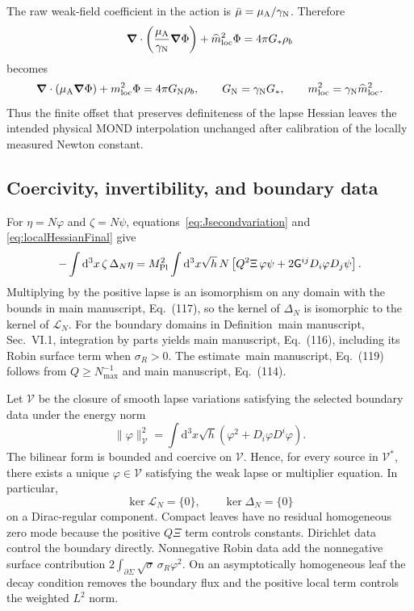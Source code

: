 \documentclass[aps,prd,reprint,onecolumn,notitlepage,nofootinbib,longbibliography,floatfix]{revtex4-2}
\theoremstyle{scstyle}
\theoremstyle{definition}
\theoremstyle{remark}
\newcommand{\dd}{\mathrm{d}}
\newcommand{\mpl}{M_{\rm Pl}}
\begin{document}
The raw weak-field coefficient in the action is $\bar\mu=\mu_{\rm A}/\gamma_{\rm N}$. Therefore
\begin{equation}
\bm\nabla\cdot\left(\frac{\mu_{\rm A}}{\gamma_{\rm N}}\bm\nabla\Phi\right)
+\widehat m_{\rm loc}^2\Phi
=4\pi G_*\rho_b
\label{eq:rawPoisson}
\end{equation}
becomes
\begin{equation}
\bm\nabla\cdot\left(\mu_{\rm A}\bm\nabla\Phi\right)
+m_{\rm loc}^2\Phi
=4\pi G_{\rm N}\rho_b,
\qquad
G_{\rm N}=\gamma_{\rm N}G_*,
\qquad
m_{\rm loc}^2=\gamma_{\rm N}\widehat m_{\rm loc}^2.
\label{eq:physicalPoisson}
\end{equation}
Thus the finite offset that preserves definiteness of the lapse Hessian leaves the intended physical MOND interpolation unchanged after calibration of the locally measured Newton constant.

\subsection{Coercivity, invertibility, and boundary data}
\label{app:coercivity}

For $\eta=N\varphi$ and $\zeta=N\psi$, equations~\eqref{eq:Jsecondvariation} and \eqref{eq:localHessianFinal} give
\begin{equation}
-\int\dd^3x\,\zeta\,\Delta_N\eta
=\mpl^2\int\dd^3x\sqrt h\,N
\left[Q^2\Xi\,\varphi\psi
+2\mathsf G^{ij}D_i\varphi D_j\psi\right].
\label{eq:Deltaquadraticraw}
\end{equation}
Multiplying by the positive lapse is an isomorphism on any domain with the bounds in main manuscript, Eq.~(117), so the kernel of $\Delta_N$ is isomorphic to the kernel of $\mathscr L_N$. For the boundary domains in Definition~main manuscript, Sec.~VI.1, integration by parts yields main manuscript, Eq.~(116), including its Robin surface term when $\sigma_R>0$. The estimate~main manuscript, Eq.~(119) follows from $Q\ge N_{\max}^{-1}$ and main manuscript, Eq.~(114).

Let $\mathcal V$ be the closure of smooth lapse variations satisfying the selected boundary data under the energy norm
\begin{equation}
\|\varphi\|_{\mathcal V}^2
=\int\dd^3x\sqrt h\left(\varphi^2+D_i\varphi D^i\varphi\right).
\label{eq:energynorm}
\end{equation}
The bilinear form is bounded and coercive on $\mathcal V$. Hence, for every source in $\mathcal V^*$, there exists a unique $\varphi\in\mathcal V$ satisfying the weak lapse or multiplier equation. In particular,
\begin{equation}
\ker\mathscr L_N=\{0\},
\qquad
\ker\Delta_N=\{0\}
\label{eq:trivialkernel}
\end{equation}
on a Dirac-regular component. Compact leaves have no residual homogeneous zero mode because the positive $Q\Xi$ term controls constants. Dirichlet data control the boundary directly. Nonnegative Robin data add the nonnegative surface contribution $2\int_{\partial\Sigma}\sqrt\sigma\,\sigma_R\varphi^2$. On an asymptotically homogeneous leaf the decay condition removes the boundary flux and the positive local term controls the weighted $L^2$ norm.
\end{document}
